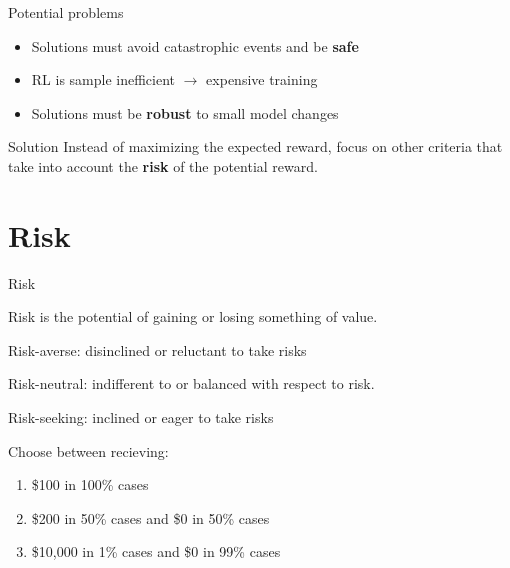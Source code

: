 \documentclass{beamer}
\begin{document}
\begin{frame}{Potential problems}

\begin{itemize}
\item Solutions must avoid catastrophic events and be \textbf{safe}
\item RL is sample inefficient $\to$ expensive training
\item Solutions must be \textbf{robust} to small model changes
\end{itemize}

\vspace{1cm}

\begin{block}{Solution}
Instead of maximizing the expected reward, focus on other criteria that take into account the \textbf{risk} of the potential reward.
\end{block}

\end{frame}


\section{Risk}

\begin{frame}{Risk}
\begin{definition}
Risk is the potential of gaining or losing something of value.

\vspace{3mm}
Risk-averse: disinclined or reluctant to take risks

\vspace{1mm}
Risk-neutral: indifferent to or balanced with respect to risk.

\vspace{1mm}
Risk-seeking: inclined or eager to take risks
\end{definition}



\begin{example}
Choose between recieving:
\begin{enumerate}
\item \$100 in 100\% cases
\item \$200 in 50\% cases and \$0 in 50\% cases
\item \$10,000 in 1\% cases and \$0 in 99\% cases
\end{enumerate}
\end{example}
\end{frame}
\end{document}
